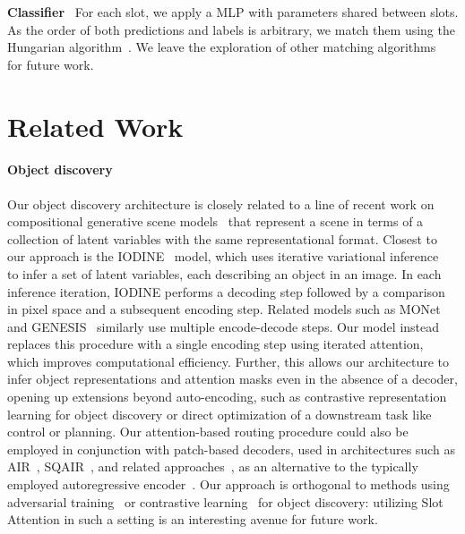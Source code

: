 \documentclass{article}
\begin{document}
\textbf{Classifier} \ For each slot, we apply a MLP with parameters shared between slots. As the order of both predictions and labels is arbitrary, we match them using the Hungarian algorithm~\citep{kuhn1955hungarian}. We leave the exploration of other matching algorithms~\citep{cuturi2013sinkhorn,zeng2019dmm} for future work.

\section{Related Work}\label{sec:related_work}
\paragraph{Object discovery}
Our object discovery architecture is closely related to a line of recent work on compositional generative scene models~\citep{greff2016tagger,eslami2016attend,greff2017neural,nash2017multi,van2018relational,kosiorek2018sequential,greff2019multi,burgess2019monet,engelcke2019genesis,stelzner2019faster,crawford2019spatially,jiang2019scalable,lin2020space} that represent a scene in terms of a collection of latent variables with the same representational format. Closest to our approach is the IODINE~\citep{greff2019multi} model, which uses iterative variational inference~\citep{marino2018iterative} to infer a set of latent variables, each describing an object in an image. In each inference iteration, IODINE performs a decoding step followed by a comparison in pixel space and a subsequent encoding step. Related models such as MONet~\citep{burgess2019monet} and GENESIS~\citep{engelcke2019genesis} similarly use multiple encode-decode steps. Our model instead replaces this procedure with a single encoding step using iterated attention, which improves computational efficiency. Further, this allows our architecture to infer object representations and attention masks even in the absence of a decoder, opening up extensions beyond auto-encoding, such as contrastive representation learning for object discovery \citep{kipf2019contrastive} or direct optimization of a downstream task like control or planning. Our attention-based routing procedure could also be employed in conjunction with patch-based decoders, used in architectures such as AIR~\citep{eslami2016attend}, SQAIR~\citep{kosiorek2018sequential}, and related approaches~\citep{stelzner2019faster,crawford2019spatially,jiang2019scalable,lin2020space}, as an alternative to the typically employed autoregressive encoder~\citep{eslami2016attend,kosiorek2018sequential}. Our approach is orthogonal to methods using adversarial training~\citep{van2018case,chen2019unsupervised,yang2020learning} or contrastive learning~\citep{kipf2019contrastive} for object discovery: utilizing Slot Attention in such a setting is an interesting avenue for future work.
\end{document}
